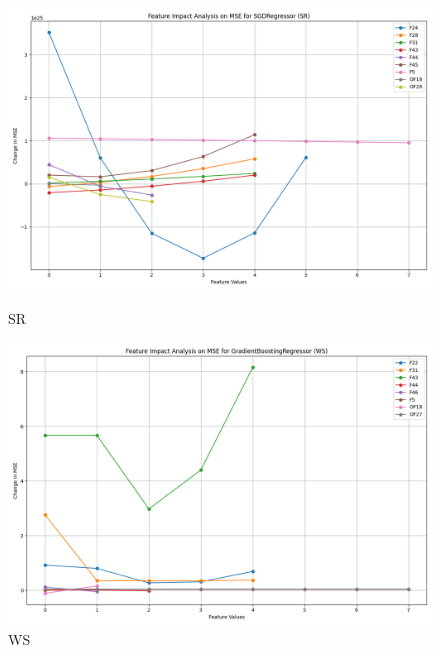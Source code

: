 \begin{figure}[H]
    \centering
    \begin{minipage}{0.495\textwidth}
        \centering
        \includegraphics[width=\linewidth]{analysis/images_reg/feature_impact_mse_SR_SGDRegressor.png}
        \caption{SR}
        \label{fig:sr_mse_analysis}
    \end{minipage}\hfill
    \begin{minipage}{0.495\textwidth}
        \centering
        \includegraphics[width=\linewidth]{analysis/images_reg/feature_impact_mse_WS_GradientBoostingRegressor.png}
        \caption{WS}
        \label{fig:ws_mse_analysis}
    \end{minipage}
\end{figure}

